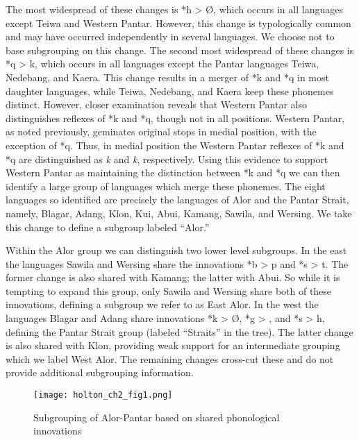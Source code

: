 The most widespread of these changes is *h {\textgreater} {\O}, which occurs in all languages except Teiwa and Western Pantar. However, this change is typologically common and may have occurred independently in several languages. We choose not to base subgrouping on this change. The second most widespread of these changes is *q {\textgreater} k, which occurs in all languages except the Pantar languages Teiwa, Nedebang, and Kaera. This change results in a merger of *k and *q in most daughter languages, while Teiwa, Nedebang, and Kaera keep these phonemes distinct. However, closer examination reveals that Western Pantar also distinguishes reflexes of *k and *q, though not in all positions. Western Pantar, as noted previously, geminates original stops in medial position, with the exception of *q. Thus, in medial position the Western Pantar reflexes of *k and *q are distinguished as \textit{k{\textlengthmark}} and \textit{k}, respectively. Using this evidence to support Western Pantar as maintaining the 
distinction between *k and *q we can then identify a large group of languages which merge these phonemes. The eight languages so identified are precisely the languages of Alor and the Pantar Strait, namely, Blagar, Adang, Klon, Kui, Abui, Kamang, Sawila, and Wersing. We take this change to define a subgroup labeled ``Alor.''

Within the Alor group we can distinguish two lower level subgroups. In the east the languages Sawila and Wersing share the innovations *b {\textgreater} p and *s {\textgreater} t. The former change is also shared with Kamang; the latter with Abui. So while it is tempting to expand this group, only Sawila and Wersing share both of these innovations, defining a subgroup we refer to as East Alor. In the west the languages Blagar and Adang share innovations *k {\textgreater} {\O}, *g {\textgreater} {\textglotstop}, and *s {\textgreater} h, defining the Pantar Strait group (labeled ``Straits'' in the tree). The latter change is also shared with Klon, providing weak support for an intermediate grouping which we label West Alor. The remaining changes cross-cut these and do not provide additional subgrouping information. 

\begin{figure} 
\texttt{[image: holton\_ch2\_fig1.png]}

\caption{Subgrouping of Alor-Pantar based on shared phonological innovations}
\label{fig:2:1}
\end{figure}

